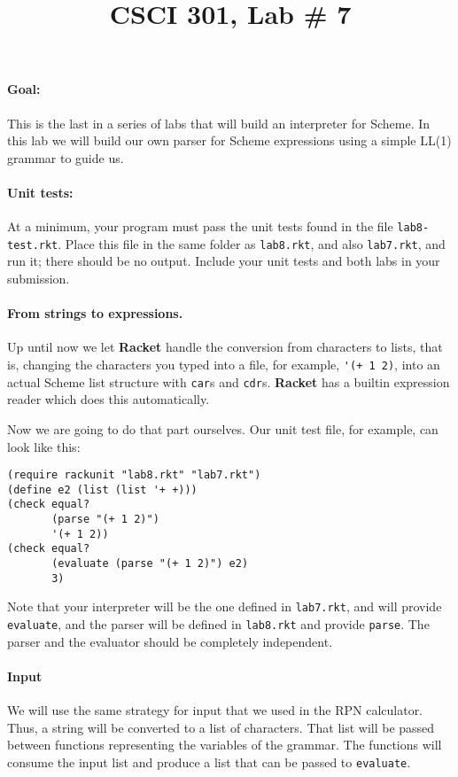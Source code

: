 \documentclass[letterpaper,12pt]{article}
\title{CSCI 301, Lab \# 7}
\author{\term}
\date{}
\begin{document}
\maketitle

\paragraph{Goal:} This is the last in a series of labs that will
build an interpreter for Scheme.  In this lab we will build our own
parser for Scheme expressions using a simple LL(1) grammar to guide
us. 

\paragraph{Unit tests:}
At a minimum, your program must pass the unit tests found in the file
\texttt{lab8-test.rkt}.  Place this file in the same folder as
\texttt{lab8.rkt}, and also \texttt{lab7.rkt}, and run it; there should be no
output.  Include your unit tests and both labs in your submission.

\paragraph{From strings to expressions.}

Up until now we let {\bf Racket} handle the conversion from characters to lists,
that is, changing the characters you typed into a file, for example,
\verb|'(+ 1 2)|, into an actual Scheme list structure with \texttt{car}s and
\texttt{cdr}s.  \textbf{Racket} has a builtin expression reader which does this
automatically.

Now we are going to do that part ourselves.  Our unit test file, for example,
can look like this:
\begin{Verbatim}[frame=single]
(require rackunit "lab8.rkt" "lab7.rkt")
(define e2 (list (list '+ +)))
(check equal?
       (parse "(+ 1 2)")
       '(+ 1 2))
(check equal?
       (evaluate (parse "(+ 1 2)") e2)
       3)
\end{Verbatim}
Note that your interpreter will be the one defined in \texttt{lab7.rkt}, and
will provide \texttt{evaluate}, and the parser will be defined in
\texttt{lab8.rkt} and provide \texttt{parse}.  The parser and the evaluator
should be completely independent.


\paragraph{Input}
We will use the same strategy for input that we used in the RPN calculator.
Thus, a string will be converted to a list of characters.  That list will be
passed between functions representing the variables of the grammar.  The
functions will consume the input list and produce a list that can be passed to
\texttt{evaluate}.  
\end{document}
